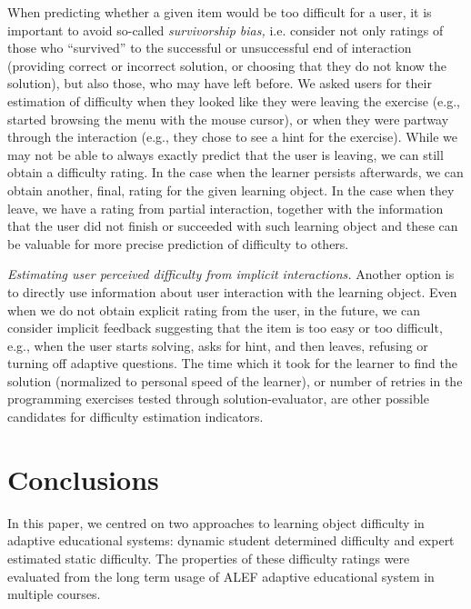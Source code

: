 \documentclass{llncs}
\begin{document}
When predicting whether a given item would be too difficult for a user, it is important to avoid so-called \emph{survivorship bias,} i.e. consider not only ratings of those who ``survived'' to the successful or unsuccessful end of interaction (providing correct or incorrect solution, or choosing that they do not know the solution), but also those, who may have left before. We asked users for their estimation of difficulty when they looked like they were leaving the exercise (e.g., started browsing the menu with the mouse cursor), or when they were partway through the interaction (e.g., they chose to see a hint for the exercise). While we may not be able to always exactly predict that the user is leaving, we can still obtain a difficulty rating. In the case when the learner persists afterwards, we can obtain another, final, rating for the given learning object. In the case when they leave, we have a rating from partial interaction, together with the information that the user did not finish or succeeded with such learning object and these can be valuable for more precise prediction of difficulty to others.

\emph{Estimating user perceived difficulty from implicit interactions.} Another option is to directly use information about user interaction with the learning object. Even when we do not obtain explicit rating from the user, in the future, we can consider implicit feedback suggesting that the item is too easy or too difficult, e.g., when the user starts solving, asks for hint, and then leaves, refusing or turning off adaptive questions. The time which it took for the learner to find the solution (normalized to personal speed of the learner), or number of retries in the programming exercises tested through solution-evaluator, are other possible candidates for difficulty estimation indicators.

\section{Conclusions}
\label{sec6}

In this paper, we centred on two approaches to learning object difficulty in adaptive educational systems: dynamic student determined difficulty and expert estimated static difficulty. The properties of these difficulty ratings were evaluated from the long term usage of ALEF adaptive educational system in multiple courses.
\end{document}
